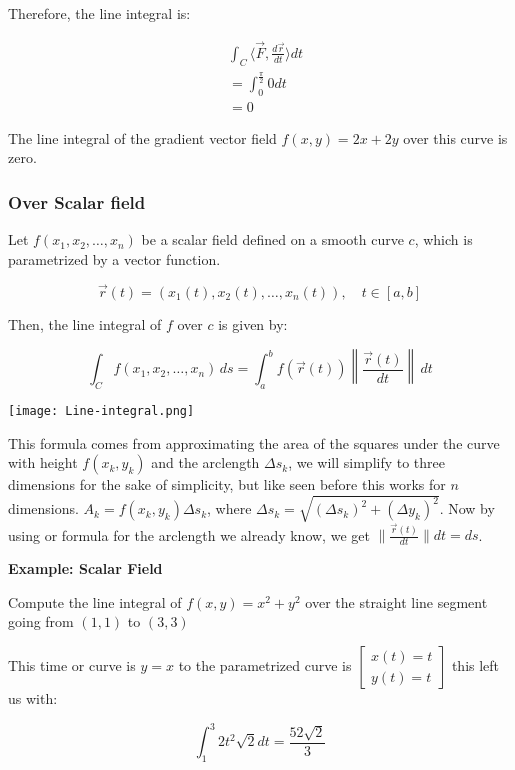 Therefore, the line integral is:

\begin{align*}
    &\int_C \langle \vec{F}, \frac{d\vec{r}}{dt}\rangle dt \\ 
    &= \int_0^{\frac{\pi}{2}}  0 dt \\
    &= 0
\end{align*}

The line integral of the gradient vector field \(f(x,y) = 2x + 2y \) over this curve is zero. 

\subsubsection{Over Scalar field}

Let \( f(x_1, x_2, \ldots, x_n) \) be a scalar field defined on a smooth curve \(c\), which 
is parametrized by a vector function.

\[
    \vec{r}(t) = (x_1(t), x_2(t), \ldots, x_n(t)), \quad t \in [a, b]
\]

Then, the line integral of \(f\) over \(c\) is given by:

\[
    \int_C f(x_1, x_2, \ldots, x_n) \, ds = \int_a^b f(\vec{r}(t)) \left\| \frac{\vec{r}(t)}{dt} \right\| \, dt
\]

\begin{center}
    \texttt{[image: Line-integral.png]}
\end{center}

This formula comes from approximating the area of the squares under the curve with height \(f(x_k, y_k)\) 
and the arclength \(\varDelta s_k\), we will simplify to three dimensions for the sake
of simplicity, but like seen before this works for \(n\) dimensions. 
\(A_k = f(x_k, y_k) \varDelta s_k\), where 
\(\varDelta s_k = \sqrt{(\varDelta s_k)^2 + (\varDelta y_k)^2} \). Now by using or formula 
for the arclength we already know, we get \(\| \frac{\vec{r}(t)}{dt}\| dt = ds\). 

\textbf{Example: Scalar Field}

Compute the line integral of \(f(x,y) = x^2 + y^2\) over the straight line segment going
from \((1,1)\) to \((3,3)\)

This time or curve is \(y = x\) to the parametrized curve is \(\begin{bmatrix}
    x(t) = t \\ y(t) = t
\end{bmatrix}\) this left us with:

\[
    \int_{1}^{3}  2t^2 \sqrt{2}dt = \frac{52\sqrt{2}}{3} 
\]

